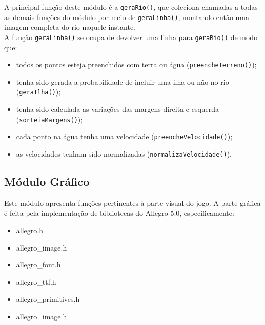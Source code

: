 \documentclass[11pt,a4paper]{article}
\begin{document}
A principal função deste módulo é a \verb|geraRio()|, que coleciona chamadas a todas as demais funções do módulo por meio de \verb|geraLinha()|, montando então uma imagem completa do rio naquele instante. \\

A função \verb|geraLinha()| se ocupa de devolver uma linha para \verb|geraRio()| de modo que:
\begin{itemize}
\item todos os pontos esteja preenchidos com terra ou água (\verb|preencheTerreno()|);
\item tenha sido gerada a probabilidade de incluir uma ilha ou não no rio (\verb|geraIlha()|);
\item tenha sido calculada as variações das margens direita e esquerda \\(\verb|sorteiaMargens()|);
\item cada ponto na água tenha uma velocidade (\verb|preencheVelocidade()|);
\item as velocidades tenham sido normalizadas (\verb|normalizaVelocidade()|).
\end{itemize}

\subsection{Módulo Gráfico}
Este módulo apresenta funções pertinentes à parte visual do jogo. A parte gráfica é feita pela implementação de bibliotecas do Allegro 5.0, especificamente:
\begin{itemize}
\item allegro.h
\item allegro\_image.h
\item allegro\_font.h
\item allegro\_ttf.h
\item allegro\_primitives.h
\item allegro\_image.h
\end{itemize}
\end{document}

